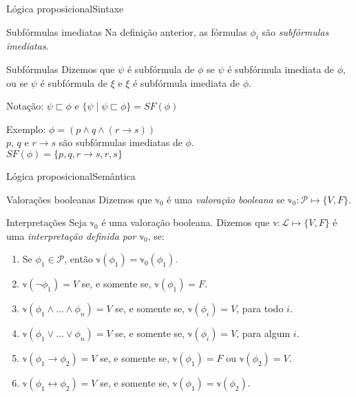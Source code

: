 \begin{frame}{Lógica proposicional}{Sintaxe}
	\begin{block}{Subfórmulas imediatas}
		Na definição anterior, as fórmulas $\phi_i$ são \emph{subfórmulas imediatas}.
	\end{block}
	
	\pause
	\begin{block}{Subfórmulas}
		Dizemos que $\psi$ é subfórmula de $\phi$ se $\psi$ é subfórmula imediata de $\phi$, ou se $\psi$ é subfórmula de $\xi$ e $\xi$ é subfórmula imediata de $\phi$.
		
		\pause Notação: $\psi \sqsubset \phi$ e $\{\psi \mid \psi \sqsubset \phi \} = SF(\phi)$
	\end{block}
	
	\pause Exemplo: $\phi = (p \wedge q \wedge (r \rightarrow s))$\\
	\pause $p$, $q$ e $r \rightarrow s$ são subfórmulas imediatas de $\phi$.\\
	\pause $SF(\phi) = \{p,q,r \rightarrow s,r,s \}$
\end{frame}

\begin{frame}{Lógica proposicional}{Semântica}
	\vspace{-.3cm}
	\begin{footnotesize}
	\begin{block}{Valorações booleanas}
		Dizemos que $\mathbb{v}_0$ é uma \emph{valoração booleana} se $\mathbb{v}_0 : \mathcal{P} \longmapsto \{V,F \}$.
	\end{block}
	\pause
	\vspace{-.2cm}
	\begin{block}{Interpretações}
		Seja $\mathbb{v}_0$ é uma valoração booleana. Dizemos que $\mathbb{v} : \mathcal{L} \longmapsto \{V,F \}$ é uma \emph{interpretação definida por $\mathbb{v}_0$}, se:
		\begin{enumerate}
			\pause\item Se $\phi_1 \in \mathcal{P}$, então $\mathbb{v}(\phi_1) = \mathbb{v}_0(\phi_1)$.
			\pause\item $\mathbb{v}(\neg \phi_1) = V$ se, e somente se, $\mathbb{v}(\phi_1) = F$.
			\pause\item $\mathbb{v}(\phi_1 \wedge ... \wedge \phi_n) = V$ se, e somente se, $\mathbb{v}(\phi_i) = V$, para todo $i$.
			\pause\item $\mathbb{v}(\phi_1 \vee ... \vee \phi_n) = V$ se, e somente se, $\mathbb{v}(\phi_i) = V$, para algum $i$.
			\pause\item $\mathbb{v}(\phi_1 \rightarrow \phi_2) = V$ se, e somente se, $\mathbb{v}(\phi_1) = F$ ou $\mathbb{v}(\phi_2) = V$.
			\pause\item $\mathbb{v}(\phi_1 \leftrightarrow \phi_2) = V$ se, e somente se, $\mathbb{v}(\phi_1) = \mathbb{v}(\phi_2)$.
		\end{enumerate}
	\end{block}
	\end{footnotesize}
\end{frame}

